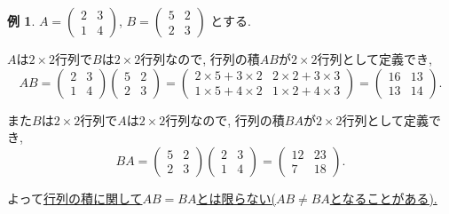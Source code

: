 \documentclass[dvipdfmx,a4paper,11pt]{article}
\theoremstyle{definition}
\newtheorem{exa}[thm]{例}
\begin{document}
 
 
 
 \begin{exa}
 $ A= 
 \begin{pmatrix}
2 & 3\\
1 & 4
 \end{pmatrix}
 $, $
 B = 
 \begin{pmatrix}
5 & 2\\
2 & 3
 \end{pmatrix}
 $
 とする. 
 
 $A$は$2\times 2$行列で$B$は$2 \times 2$行列なので, 行列の積$AB$が$2 \times 2$行列として定義でき, 
 $$
 AB = 
 \begin{pmatrix}
2 & 3\\
1 & 4
 \end{pmatrix}
 \begin{pmatrix}
5 & 2\\
2 & 3
 \end{pmatrix}
 =  
 \begin{pmatrix}
2 \times 5 + 3 \times 2& 2 \times 2 + 3 \times 3\\
1 \times 5 + 4 \times 2 & 1\times 2 + 4 \times 3
 \end{pmatrix}
 = 
 \begin{pmatrix}
16 & 13\\
13 & 14
 \end{pmatrix}.
 $$
 
また$B$は$2\times 2$行列で$A$は$2 \times 2$行列なので, 行列の積$BA$が$2 \times 2$行列として定義でき, 
 $$
 BA = 
  \begin{pmatrix}
5 & 2\\
2 & 3
 \end{pmatrix}
  \begin{pmatrix}
2 & 3\\
1 & 4
 \end{pmatrix}
 =
  \begin{pmatrix}
12 & 23\\
7 & 18
 \end{pmatrix}.
 $$

よって\underline{行列の積に関して$AB=BA$とは限らない($AB \neq BA$となることがある).}
 \end{exa}
 
 
 
\end{document}
